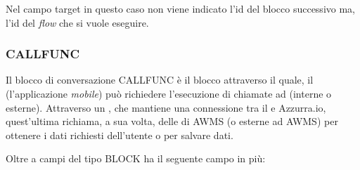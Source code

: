Nel campo target in questo caso non viene indicato l’id del blocco successivo ma, l’id del \emph{flow} che si vuole eseguire.



\subsubsection{CALLFUNC}

Il blocco di conversazione CALLFUNC è il blocco attraverso il quale, il  (l'applicazione \emph{mobile}) può richiedere l’esecuzione di chiamate ad  (interne o esterne). Attraverso un , che mantiene una connessione tra il  e Azzurra.io, quest’ultima richiama, a sua volta, delle  di \gls{AWMS} (o esterne ad \gls{AWMS}) per ottenere i dati richiesti dell’utente o per salvare dati. 


Oltre a campi del tipo BLOCK ha il seguente campo in più:

